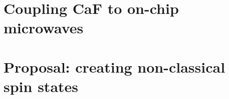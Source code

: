 \documentclass[a4paper, 12pt, twoside]{report}
\newcommand{\CaF}{CaF}
\begin{document}


%
%
%
%
%

\tableofcontents
\clearpage

\setcounter{page}{5} 



%
%
%
%
%
%
%

\chapter{Coupling \CaF{} to on-chip microwaves}
\label{mws}


\chapter{Proposal: creating non-classical spin states}
\label{squeeze}


%

\clearpage

\printbibliography
\end{document}
